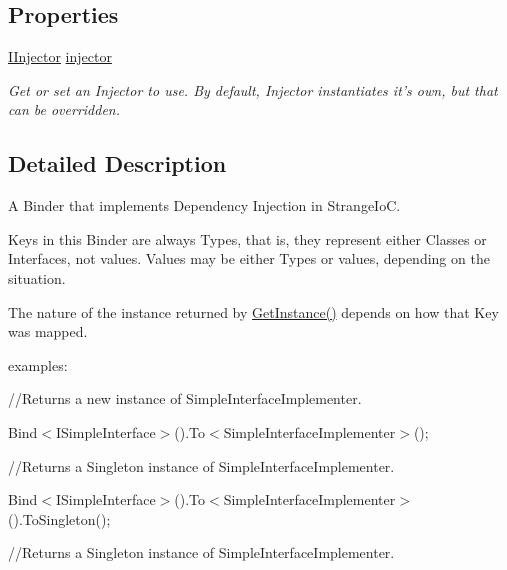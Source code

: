 \subsection*{Properties}
\begin{DoxyCompactItemize}
\item 
\hypertarget{interfacestrange_1_1extensions_1_1injector_1_1api_1_1_i_injection_binder_a372922eecd2526bfeaa5d802526cef44}{\hyperlink{interfacestrange_1_1extensions_1_1injector_1_1api_1_1_i_injector}{I\-Injector} \hyperlink{interfacestrange_1_1extensions_1_1injector_1_1api_1_1_i_injection_binder_a372922eecd2526bfeaa5d802526cef44}{injector}}\label{interfacestrange_1_1extensions_1_1injector_1_1api_1_1_i_injection_binder_a372922eecd2526bfeaa5d802526cef44}

\begin{DoxyCompactList}\small\item\em Get or set an Injector to use. By default, Injector instantiates it's own, but that can be overridden. \end{DoxyCompactList}\end{DoxyCompactItemize}


\subsection{Detailed Description}
A Binder that implements Dependency Injection in Strange\-Io\-C. 

Keys in this Binder are always Types, that is, they represent either Classes or Interfaces, not values. Values may be either Types or values, depending on the situation.

The nature of the instance returned by {\ttfamily \hyperlink{interfacestrange_1_1extensions_1_1injector_1_1api_1_1_i_injection_binder_a08359dc92534704919a0e9b89375db18}{Get\-Instance()}} depends on how that Key was mapped.

examples\-:

//\-Returns a new instance of Simple\-Interface\-Implementer.

{\ttfamily Bind$<$I\-Simple\-Interface$>$().To$<$Simple\-Interface\-Implementer$>$();}

//\-Returns a Singleton instance of Simple\-Interface\-Implementer.

{\ttfamily Bind$<$I\-Simple\-Interface$>$().To$<$Simple\-Interface\-Implementer$>$().To\-Singleton();}

//\-Returns a Singleton instance of Simple\-Interface\-Implementer.

